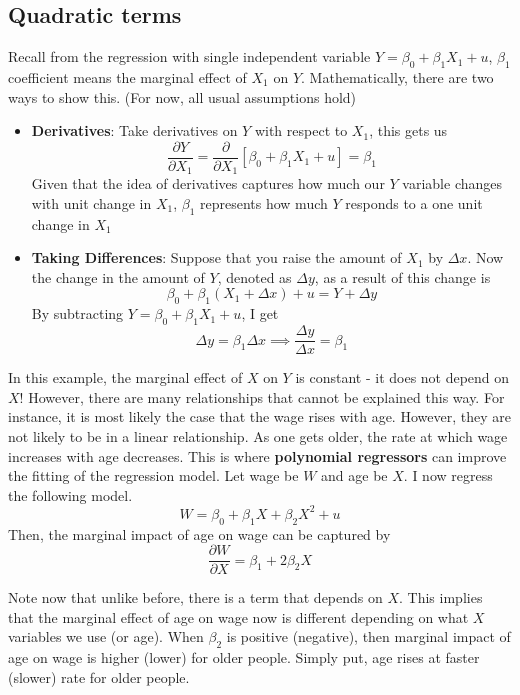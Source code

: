 \documentclass[12pt]{article}
\theoremstyle{definition}
\theoremstyle{property}
\theoremstyle{assumption}
\theoremstyle{example}
\theoremstyle{comment}
\begin{document}
\subsection{Quadratic terms}
Recall from the regression with single independent variable $Y= \beta_0 + \beta_1X_1+u$, $\beta_1$ coefficient means the marginal effect of $X_1$ on $Y$. Mathematically, there are two ways to show this. (For now, all usual assumptions hold)
\begin{itemize}
\item \textbf{Derivatives}: Take derivatives on $Y$ with respect to $X_1$, this gets us
\[
\frac{\partial Y}{\partial X_1} = \frac{\partial}{\partial X_1}[ \beta_0 + \beta_1X_1+u ] = \beta_1
\]
Given that the idea of derivatives captures how much our $Y$ variable changes with unit change in $X_1$, $\beta_1$ represents how much $Y$ responds to a one unit change in $X_1$
\item\textbf{Taking Differences}: Suppose that you raise the amount of $X_1$ by $\Delta x$. Now the change in the  amount of $Y$, denoted as $\Delta y$, as a result of this change is
\[
\beta_0 + \beta_1(X_1+\Delta x)+u = Y+\Delta y
\] 
By subtracting $Y= \beta_0 + \beta_1X_1+u$, I get
\[
\Delta y = \beta_1 \Delta x \implies \frac{\Delta y}{\Delta x} = \beta_1
\]
\end{itemize} \par\medskip
In this example, the marginal effect of $X$ on $Y$ is constant - it does not depend on $X$! However, there are many relationships that cannot be explained this way. For instance, it is most likely the case that the wage rises with age. However, they are not likely to be in a linear relationship. As one gets older, the rate at which wage increases with age decreases. This is where \textbf{polynomial regressors} can improve the fitting of the regression model. Let wage be $W$ and age be $X$. I now regress the following model.
\[
W = \beta_0 + \beta_1 X+ \beta_2 X^2+u
\]
Then, the marginal impact of age on wage can be captured by
\[
\frac{\partial W}{\partial X} = \beta_1 + 2\beta_2 X
\]\par\medskip
Note now that unlike before, there is a term that depends on $X$. This implies that the marginal effect of age on wage now is different depending on what $X$ variables we use (or age). When $\beta_2$ is positive (negative), then marginal impact of age on wage is higher (lower) for older people. Simply put, age rises at faster (slower) rate for older people. \par\medskip
\end{document}
